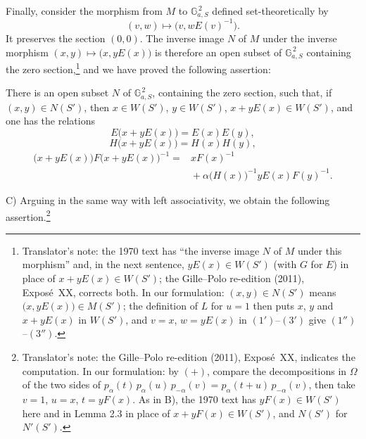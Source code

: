 Finally, consider the morphism from \(M\) to
\(\mathbb G_{a,S}^{\,2}\) defined set-theoretically by
\[
  (v,w)\longmapsto\bigl(v,wE(v)^{-1}\bigr).
\]
It preserves the section \((0,0)\). The inverse image \(N\) of \(M\)
under the inverse morphism \((x,y)\mapsto\bigl(x,yE(x)\bigr)\) is
therefore an open subset of \(\mathbb G_{a,S}^{\,2}\) containing the
zero section,\footnote{Translator's note: the 1970 text has ``the inverse image \(N\) of \(M\) under
this morphism'' and, in the next sentence, \(yE(x)\in W(S')\) (with \(G\) for \(E\)) in place of
\(x+yE(x)\in W(S')\); the Gille--Polo re-edition (2011), Exposé~XX, corrects both. In our
formulation: \((x,y)\in N(S')\) means \(\bigl(x,yE(x)\bigr)\in M(S')\); the definition of \(L\) for
\(u=1\) then puts \(x\), \(y\) and \(x+yE(x)\) in \(W(S')\), and \(v=x\), \(w=yE(x)\) in
\((1')\)--\((3')\) give \((1'')\)--\((3'')\).} and we have proved the following assertion:

There is an open subset \(N\) of
\(\mathbb G_{a,S}^{\,2}\), containing the zero section, such that,
if \((x,y)\in N(S')\), then \(x\in W(S')\), \(y\in W(S')\),
\(x+yE(x)\in W(S')\), and one has the relations
\begin{equation}\tag{1''}
  E\bigl(x+yE(x)\bigr)=E(x)E(y),
\end{equation}
\begin{equation}\tag{2''}
  H\bigl(x+yE(x)\bigr)=H(x)H(y),
\end{equation}
\begin{equation}\tag{3''}
\begin{split}
  \bigl(x+yE(x)\bigr)F\bigl(x+yE(x)\bigr)^{-1}
   ={}&xF(x)^{-1}\\
     &{}+\alpha\bigl(H(x)\bigr)^{-1}yE(x)F(y)^{-1}.
\end{split}
\end{equation}

\textup{C)} Arguing in the same way with left associativity, we
obtain the following assertion.\footnote{Translator's note: the Gille--Polo re-edition (2011), Exposé~XX, indicates the computation. In our
formulation: by \((+)\), compare the decompositions in \(\Omega\) of the two sides of
\(p_\alpha(t)\,p_\alpha(u)\,p_{-\alpha}(v)=p_\alpha(t+u)\,p_{-\alpha}(v)\), then take \(v=1\),
\(u=x\), \(t=yF(x)\). As in B), the 1970 text has \(yF(x)\in W(S')\) here and in Lemma 2.3 in place
of \(x+yF(x)\in W(S')\), and \(N(S')\) for \(N'(S')\).}

